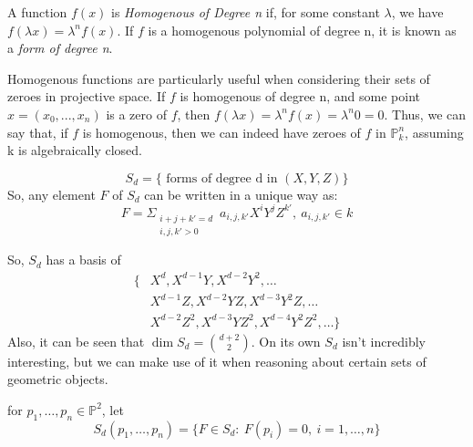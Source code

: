 \begin{mydef}
A function $f(x)$ is \emph{Homogenous of Degree n} if, for some 
constant $\lambda$, we have $f(\lambda x) = \lambda ^n f(x)$.
If $f$ is a homogenous polynomial of degree n, it is known as a \emph{form of degree n}.
\end{mydef}

Homogenous functions are particularly useful when considering their
sets of zeroes in projective space. If $f$ is homogenous of degree
n, and some point $x = (x_0, ..., x_n)$ is a zero of $f$, then
$f(\lambda x) = \lambda^n f(x) = \lambda^n 0 = 0$. Thus, we can say
that, if $f$ is homogenous, then we can indeed have zeroes of $f$ in $\mathbb{P}^n_k$,
assuming k is algebraically closed.

\begin{mydef}
\[
S_d = \{\text{ forms of degree d in $(X, Y, Z)$}\}
\]
So, any element $F$ of $S_d$ can be written in a unique way as:
\[
F = \Sigma _{\substack{i+j+k'=d \\ i,j,k' > 0}}~a_{i,j,k'} X^i Y^j Z^{k'},~a_{i,j,k'} \in k
\]
\end{mydef}
So, $S_d$ has a basis of 
\begin{align*}
\{&X^d, X^{d-1}Y, X^{d-2}Y^2, \dots\\
&X^{d-1}Z, X^{d-2}YZ, X^{d-3}Y^2Z, \dots\\
&X^{d-2}Z^2, X^{d-3}YZ^2, X^{d-4}Y^2Z^2, \dots\}
\end{align*}
Also, it can be seen that $\dim S_d = {d+2 \choose 2}$. On its own
$S_d$ isn't incredibly interesting, but we can make use of it when
reasoning about certain sets of geometric objects.

\begin{mydef}
for $p_1, \dots, p_n \in \mathbb{P}^2$, let
\[
	S_d(p_1, \dots, p_n) = \{ F \in S_d :~F(p_i) = 0,~i=1,\dots,n\}
\]
\end{mydef}
